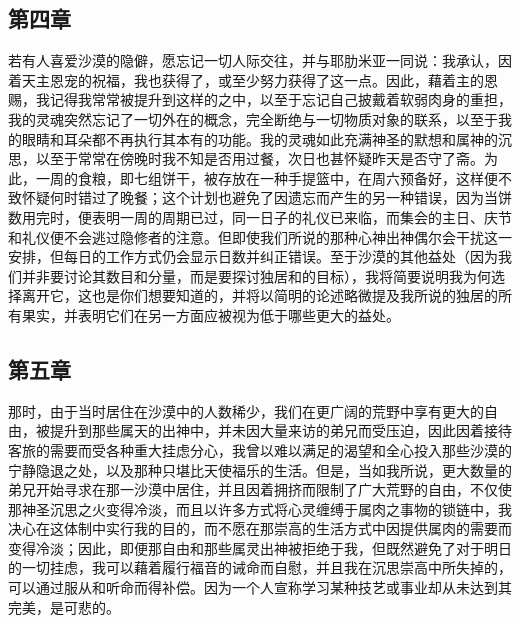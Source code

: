 \subsection{第四章}

\par

若有人喜爱沙漠的隐僻，愿忘记一切人际交往，并与耶肋米亚一同说：我承认，因着天主恩宠的祝福，我也获得了，或至少努力获得了这一点。因此，藉着主的恩赐，我记得我常常被提升到这样的之中，以至于忘记自己披戴着软弱肉身的重担，我的灵魂突然忘记了一切外在的概念，完全断绝与一切物质对象的联系，以至于我的眼睛和耳朵都不再执行其本有的功能。我的灵魂如此充满神圣的默想和属神的沉思，以至于常常在傍晚时我不知是否用过餐，次日也甚怀疑昨天是否守了斋。为此，一周的食粮，即七组饼干，被存放在一种手提篮中，在周六预备好，这样便不致怀疑何时错过了晚餐；这个计划也避免了因遗忘而产生的另一种错误，因为当饼数用完时，便表明一周的周期已过，同一日子的礼仪已来临，而集会的主日、庆节和礼仪便不会逃过隐修者的注意。但即使我们所说的那种心神出神偶尔会干扰这一安排，但每日的工作方式仍会显示日数并纠正错误。至于沙漠的其他益处（因为我们并非要讨论其数目和分量，而是要探讨独居和的目标），我将简要说明我为何选择离开它，这也是你们想要知道的，并将以简明的论述略微提及我所说的独居的所有果实，并表明它们在另一方面应被视为低于哪些更大的益处。\par


\subsection{第五章}

\par

那时，由于当时居住在沙漠中的人数稀少，我们在更广阔的荒野中享有更大的自由，被提升到那些属天的出神中，并未因大量来访的弟兄而受压迫，因此因着接待客旅的需要而受各种重大挂虑分心，我曾以难以满足的渴望和全心投入那些沙漠的宁静隐退之处，以及那种只堪比天使福乐的生活。但是，当如我所说，更大数量的弟兄开始寻求在那一沙漠中居住，并且因着拥挤而限制了广大荒野的自由，不仅使那神圣沉思之火变得冷淡，而且以许多方式将心灵缠缚于属肉之事物的锁链中，我决心在这体制中实行我的目的，而不愿在那崇高的生活方式中因提供属肉的需要而变得冷淡；因此，即便那自由和那些属灵出神被拒绝于我，但既然避免了对于明日的一切挂虑，我可以藉着履行福音的诫命而自慰，并且我在沉思崇高中所失掉的，可以通过服从和听命而得补偿。因为一个人宣称学习某种技艺或事业却从未达到其完美，是可悲的。\par

